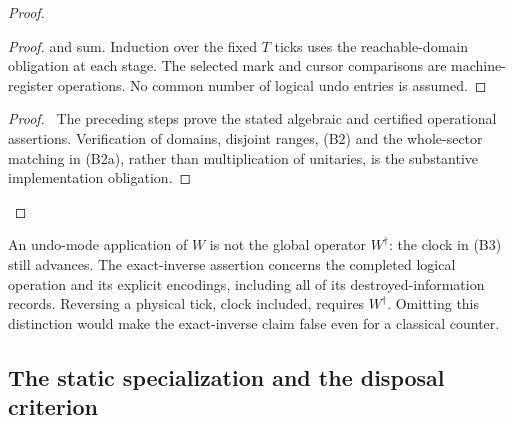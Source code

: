 \begin{proof}
\begin{proof}
 and sum. Induction over the fixed $T$ ticks uses the reachable-domain
 obligation at each stage. The selected mark and cursor comparisons are
 machine-register operations. No common number of logical undo entries
 is assumed.\end{proof}
 \qedstep
 \begin{proof}\pf\ The preceding steps prove the stated algebraic and
 certified operational assertions. Verification of domains, disjoint
 ranges, (B2) and the whole-sector matching in (B2a), rather than
 multiplication of unitaries, is the
 substantive implementation obligation.\end{proof}
\end{proof}

\begin{remark}
An undo-mode application of $W$ is not the global operator $W^\dagger$:
the clock in (B3) still advances. The exact-inverse assertion concerns
the completed logical operation and its explicit encodings, including
all of its destroyed-information records. Reversing a physical tick,
clock included, requires $W^\dagger$. Omitting this distinction would
make the exact-inverse claim false even for a classical counter.
\end{remark}

\subsection{The static specialization and the disposal criterion}

